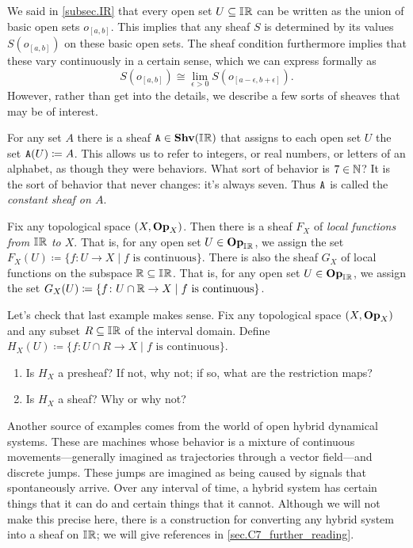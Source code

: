 \documentclass[7Sketches]{subfiles}
\begin{document}
We said in \cref{subsec.IR} that every open set $U\subseteq\mathbb{I}\hspace{.6pt}\mathbb{R}$ can be written as the union of basic open sets $o_{[a,b]}$. This implies that any sheaf $S$ is determined by its values $S(o_{[a,b]})$ on these basic open sets. The sheaf condition furthermore implies that these vary continuously in a certain sense, which we can express formally as
\[S(o_{[a,b]})\cong\lim_{\epsilon>0}S(o_{[a-\epsilon,b+\epsilon]}).\]
However, rather than get into the details, we describe a few sorts of sheaves that may be of interest.

\begin{example}%
For any set $A$ there is a sheaf $\mathtt{A}\in\mathbf{Shv}(\mathbb{I}\hspace{.6pt}\mathbb{R})$ that assigns to each open set $U$ the set $\mathtt{A}(U)\coloneqq A$. This allows us to refer to integers, or real numbers, or letters of an alphabet, as though they were behaviors. What sort of behavior is $7\in\mathbb{N}$? It is the sort of behavior that never changes: it's always seven. Thus $\mathtt{A}$ is called the \emph{constant sheaf on $A$}.
\end{example}

\begin{example}%
Fix any topological space $(X,\mathbf{Op}_X)$. Then there is a sheaf $F_X$ of \emph{local functions from $\mathbb{I}\hspace{.6pt}\mathbb{R}$ to $X$}. That is, for any open set $U\in\mathbf{Op}_{\mathbb{I}\hspace{.6pt}\mathbb{R}}$, we assign the set $F_X(U)\coloneqq\{f\colon U\to X\mid f\text{ is continuous}\}$. There is also the sheaf $G_X$ of local functions on the subspace $\mathbb{R}\subseteq\mathbb{I}\hspace{.6pt}\mathbb{R}$. That is, for any open set $U\in\mathbf{Op}_{\mathbb{I}\hspace{.6pt}\mathbb{R}}$, we assign the set $G_X(U)\coloneqq\{f\colon U\cap\mathbb{R}\to X\mid f\text{ is continuous}\}$. 
\end{example}

\begin{exercise}%
\label{exc.interval_domain_top}
Let's check that last example makes sense. Fix any topological space $(X,\mathbf{Op}_X)$ and any subset $R\subseteq\mathbb{I}\hspace{.6pt}\mathbb{R}$ of the interval domain. Define $H_X(U)\coloneqq\{f\colon U\cap R\to X\mid f\text{ is continuous}\}$.
\begin{enumerate}
	\item Is $H_X$ a presheaf? If not, why not; if so, what are the restriction maps?
	\item Is $H_X$ a sheaf? Why or why not?
	\qedhere
\qedhere
\end{enumerate}
\end{exercise}


\begin{example}
Another source of examples comes from the world of open hybrid dynamical systems. These are machines whose behavior is a mixture of continuous movements---generally imagined as trajectories through a vector field---and discrete jumps. These jumps are imagined as being caused by signals that spontaneously arrive. Over any interval of time, a hybrid system has certain things that it can do and certain things that it cannot. Although we will not make this precise here, there is a construction for converting any hybrid system into a sheaf on $\mathbb{I}\hspace{.6pt}\mathbb{R}$; we will give references in \cref{sec.C7_further_reading}.%
\end{example}
\end{document}
